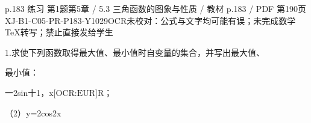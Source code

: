 \begin{bankitem}{p.183 练习 第1题}{第5章 / 5.3 三角函数的图象与性质 / 教材 p.183 / PDF 第190页}{XJ-B1-C05-PR-P183-Y1029}{OCR未校对：公式与文字均可能有误；未完成数学TeX转写；禁止直接发给学生}
\begin{ocrdraft}
\par
1.求使下列函数取得最大值、最小值时自变量的集合，并写出最大值、
\par
最小值：
\par
一2sin十1，x\ensuremath{\text{[OCR:EUR]}}R；
\par
（2）y=2cos2x
\end{ocrdraft}
\end{bankitem}
